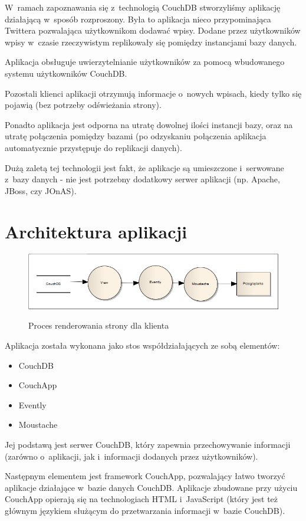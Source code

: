 \documentclass[a4paper]{article}
\begin{document}
W~ramach zapoznawania się z~technologią CouchDB stworzyliśmy aplikację działającą w~sposób rozproszony.
Była to aplikacja nieco przypominająca Twittera pozwalająca użytkownikom dodawać wpisy.
Dodane przez użytkowników wpisy w~czasie rzeczywistym replikowały się pomiędzy instancjami bazy danych.

Aplikacja obsługuje uwierzytelnianie użytkowników za pomocą wbudowanego systemu użytkowników CouchDB.

Pozostali klienci aplikacji otrzymują informacje o~nowych wpisach, kiedy tylko się pojawią (bez potrzeby odświeżania strony).

Ponadto aplikacja jest odporna na utratę dowolnej ilości instancji bazy, oraz na utratę połączenia pomiędzy bazami
(po odzyskaniu połączenia aplikacja automatycznie przystępuje do replikacji danych).

Dużą zaletą tej technologii jest fakt, że aplikacje są umieszczone i~serwowane z~bazy danych - nie jest potrzebny dodatkowy serwer aplikacji (np. Apache, JBoss, czy JOnAS).


\newpage
\section{Architektura aplikacji}
\begin{figure}[bt]
  \caption{Proces renderowania strony dla klienta}
  \centering
  \includegraphics[width=\textwidth]{couch.png}
  \label{arch}
\end{figure}

Aplikacja została wykonana jako stos współdziałających ze sobą elementów:
\begin{itemize}
  \item CouchDB
  \item CouchApp
  \item Evently
  \item Moustache
\end{itemize}

Jej podstawą jest serwer CouchDB, który zapewnia przechowywanie informacji (zarówno o~aplikacji, jak i~informacji dodanych przez użytkowników).

Następnym elementem jest framework CouchApp, pozwalający łatwo tworzyć aplikacje działające w~bazie danych CouchDB.
Aplikacje zbudowane przy użyciu CouchApp opierają się na technologiach HTML i~JavaScript (który jest też głównym językiem służącym do przetwarzania informacji w~bazie CouchDB).
\end{document}
